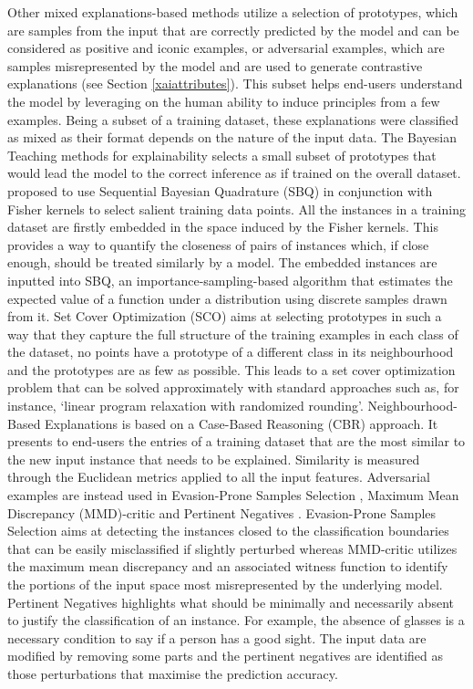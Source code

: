 \documentclass[final,1p,times]{elsarticle}
\begin{document}
Other mixed explanations-based methods utilize a selection of prototypes, which are samples from the input that are correctly predicted by the model and can be considered as positive and iconic examples, or adversarial examples, which are samples misrepresented by the model and are used to generate contrastive explanations (see Section \ref{xaiattributes}). This subset helps end-users understand the model by leveraging on the human ability to induce principles from a few examples. Being a subset of a training dataset, these explanations were classified as mixed as their format depends on the nature of the input data.
The Bayesian Teaching methods for explainability \cite{yang2017explainable} selects a small subset of prototypes that would lead the model to the correct inference as if trained on the overall dataset.
\cite{khanna2019interpreting} proposed to use Sequential Bayesian Quadrature (SBQ) in conjunction with Fisher kernels to select salient training data points. All the instances in a training dataset are firstly embedded in the space induced by the Fisher kernels. This provides a way to quantify the closeness of pairs of instances which, if close enough, should be treated similarly by a model. The embedded instances are inputted into SBQ, an importance-sampling-based algorithm that estimates the expected value of a function under a distribution using discrete samples drawn from it.
Set Cover Optimization (SCO) \cite{bien2011prototype} aims at selecting prototypes in such a way that they capture the full structure of the training examples in each class of the dataset, no points have a prototype of a different class in its neighbourhood and the prototypes are as few as possible. This leads to a set cover optimization problem that can be solved approximately with standard approaches such as, for instance, `linear program relaxation with randomized rounding'.
Neighbourhood-Based Explanations \cite{caruana1999case} is based on a Case-Based Reasoning (CBR) approach. It presents to end-users the entries of a training dataset that are the most similar to the new input instance that needs to be explained. Similarity is measured through the Euclidean metrics applied to all the input features.
Adversarial examples are instead used in Evasion-Prone Samples Selection \cite{liu2018adversarial}, Maximum Mean Discrepancy (MMD)-critic \cite{kim2016examples} and Pertinent Negatives \cite{dhurandhar2018explanations}. Evasion-Prone Samples Selection aims at detecting the instances closed to the classification boundaries that can be easily misclassified if slightly perturbed whereas MMD-critic utilizes the maximum mean discrepancy and an associated witness function to identify the portions of the input space most misrepresented by the underlying model. Pertinent Negatives highlights what should be minimally and necessarily absent to justify the classification of an instance. For example, the absence of glasses is a necessary condition to say if a person has a good sight. The input data are modified by removing some parts and the pertinent negatives are identified as those perturbations that maximise the prediction accuracy.
\end{document}
